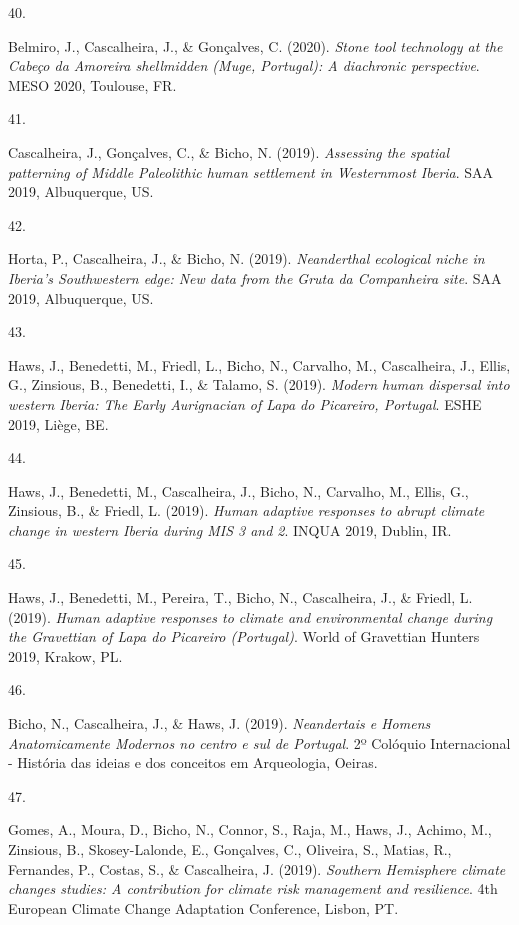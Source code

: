 \documentclass[11pt,a4paper,]{awesome-cv}
\newlength{\cslhangindent}
\newlength{\csllabelwidth}
\newenvironment{CSLReferences}[2] %
 {\begin{list}{}{%
  \setlength{\itemindent}{0pt}
  \setlength{\leftmargin}{0pt}
  \setlength{\parsep}{0pt}
  \ifodd #1
   \setlength{\leftmargin}{\cslhangindent}
   \setlength{\itemindent}{-1\cslhangindent}
  \fi
  \setlength{\itemsep}{#2\baselineskip}}}
 {\end{list}}
\newcommand{\CSLLeftMargin}[1]{\parbox[t]{\csllabelwidth}{\strut#1\strut}}
\newcommand{\CSLRightInline}[1]{\parbox[t]{\linewidth - \csllabelwidth}{\strut#1\strut}}
\begin{document}
\begin{CSLReferences}{0}{0}
\CSLLeftMargin{40. }%
\CSLRightInline{Belmiro, J., Cascalheira, J., \& Gonçalves, C. (2020).
\emph{Stone tool technology at the Cabeço da Amoreira shellmidden (Muge,
Portugal): A diachronic perspective}. MESO 2020, Toulouse, FR.}

\CSLLeftMargin{41. }%
\CSLRightInline{Cascalheira, J., Gonçalves, C., \& Bicho, N. (2019).
\emph{Assessing the spatial patterning of Middle Paleolithic human
settlement in Westernmost Iberia}. SAA 2019, Albuquerque, US.}

\CSLLeftMargin{42. }%
\CSLRightInline{Horta, P., Cascalheira, J., \& Bicho, N. (2019).
\emph{Neanderthal ecological niche in Iberia's Southwestern edge: New
data from the Gruta da Companheira site}. SAA 2019, Albuquerque, US.}

\CSLLeftMargin{43. }%
\CSLRightInline{Haws, J., Benedetti, M., Friedl, L., Bicho, N.,
Carvalho, M., Cascalheira, J., Ellis, G., Zinsious, B., Benedetti, I.,
\& Talamo, S. (2019). \emph{Modern human dispersal into western Iberia:
The Early Aurignacian of Lapa do Picareiro, Portugal}. ESHE 2019, Liège,
BE.}

\CSLLeftMargin{44. }%
\CSLRightInline{Haws, J., Benedetti, M., Cascalheira, J., Bicho, N.,
Carvalho, M., Ellis, G., Zinsious, B., \& Friedl, L. (2019). \emph{Human
adaptive responses to abrupt climate change in western Iberia during MIS
3 and 2}. INQUA 2019, Dublin, IR.}

\CSLLeftMargin{45. }%
\CSLRightInline{Haws, J., Benedetti, M., Pereira, T., Bicho, N.,
Cascalheira, J., \& Friedl, L. (2019). \emph{Human adaptive responses to
climate and environmental change during the Gravettian of Lapa do
Picareiro (Portugal)}. World of Gravettian Hunters 2019, Krakow, PL.}

\CSLLeftMargin{46. }%
\CSLRightInline{Bicho, N., Cascalheira, J., \& Haws, J. (2019).
\emph{Neandertais e Homens Anatomicamente Modernos no centro e sul de
Portugal}. 2º Colóquio Internacional - História das ideias e dos
conceitos em Arqueologia, Oeiras.}

\CSLLeftMargin{47. }%
\CSLRightInline{Gomes, A., Moura, D., Bicho, N., Connor, S., Raja, M.,
Haws, J., Achimo, M., Zinsious, B., Skosey-Lalonde, E., Gonçalves, C.,
Oliveira, S., Matias, R., Fernandes, P., Costas, S., \& Cascalheira, J.
(2019). \emph{Southern Hemisphere climate changes studies: A
contribution for climate risk management and resilience}. 4th European
Climate Change Adaptation Conference, Lisbon, PT.}


\end{CSLReferences}
\end{document}
